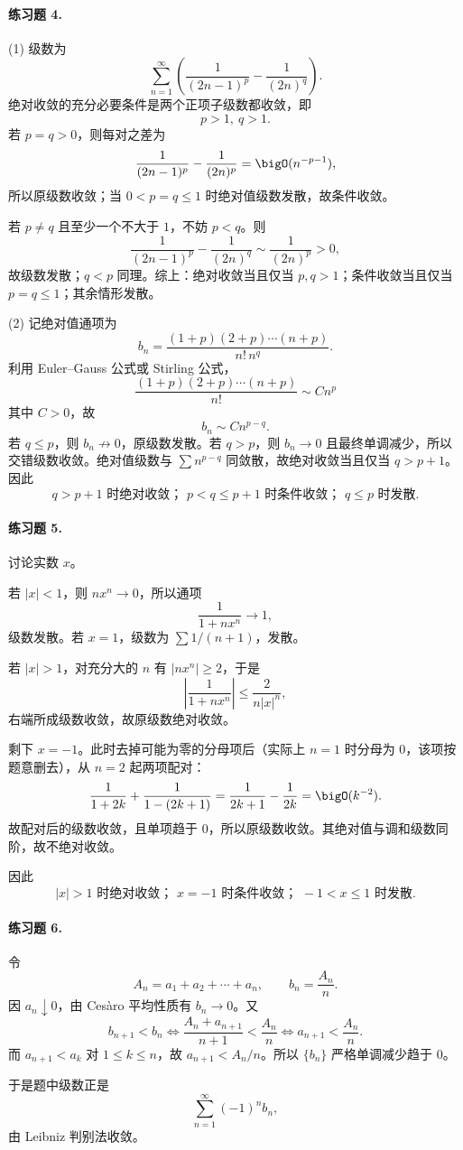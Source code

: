 \paragraph{练习题 4.}
\begin{xsolution}
(1) 级数为
\[
 \sum_{n=1}^{\infty}\left(\frac1{(2n-1)^p}-\frac1{(2n)^q}\right).
\]
绝对收敛的充分必要条件是两个正项子级数都收敛，即
\[
 \boxed{p>1,\ q>1}.
\]
若 $p=q>0$，则每对之差为
\[
 \frac1{(2n-1)^p}-\frac1{(2n)^p}=\bigO(n^{-p-1}),
\]
所以原级数收敛；当 $0<p=q\leq1$ 时绝对值级数发散，故条件收敛。

若 $p\neq q$ 且至少一个不大于 $1$，不妨 $p<q$。则
\[
 \frac1{(2n-1)^p}-\frac1{(2n)^q}\sim\frac1{(2n)^p}>0,
\]
故级数发散；$q<p$ 同理。综上：绝对收敛当且仅当 $p,q>1$；条件收敛当且仅当 $p=q\leq1$；其余情形发散。

(2) 记绝对值通项为
\[
 b_n=\frac{(1+p)(2+p)\cdots(n+p)}{n!\,n^q}.
\]
利用 Euler--Gauss 公式或 Stirling 公式，
\[
 \frac{(1+p)(2+p)\cdots(n+p)}{n!}\sim Cn^p
\]
其中 $C>0$，故
\[
 b_n\sim Cn^{p-q}.
\]
若 $q\leq p$，则 $b_n\not\to0$，原级数发散。若 $q>p$，则 $b_n\to0$ 且最终单调减少，所以交错级数收敛。绝对值级数与 $\sum n^{p-q}$ 同敛散，故绝对收敛当且仅当 $q>p+1$。因此
\[
 \boxed{q>p+1\text{ 时绝对收敛； }p<q\leq p+1\text{ 时条件收敛； }q\leq p\text{ 时发散}.}
\]
\end{xsolution}

\paragraph{练习题 5.}
\begin{xsolution}
讨论实数 $x$。

若 $|x|<1$，则 $nx^n\to0$，所以通项
\[
 \frac1{1+nx^n}\to1,
\]
级数发散。若 $x=1$，级数为 $\sum1/(n+1)$，发散。

若 $|x|>1$，对充分大的 $n$ 有 $|nx^n|\geq2$，于是
\[
 \left|\frac1{1+nx^n}\right|\leq\frac2{n|x|^n},
\]
右端所成级数收敛，故原级数绝对收敛。

剩下 $x=-1$。此时去掉可能为零的分母项后（实际上 $n=1$ 时分母为 $0$，该项按题意删去），从 $n=2$ 起两项配对：
\[
 \frac1{1+2k}+\frac1{1-(2k+1)}
 =\frac1{2k+1}-\frac1{2k}
 =\bigO(k^{-2}).
\]
故配对后的级数收敛，且单项趋于 $0$，所以原级数收敛。其绝对值与调和级数同阶，故不绝对收敛。

因此
\[
 \boxed{|x|>1\text{ 时绝对收敛； }x=-1\text{ 时条件收敛； }-1<x\leq1\text{ 时发散}.}
\]
\end{xsolution}

\paragraph{练习题 6.}
\begin{xsolution}
令
\[
 A_n=a_1+a_2+\cdots+a_n,
 \qquad
 b_n=\frac{A_n}{n}.
\]
因 $a_n\downarrow0$，由 Cesàro 平均性质有 $b_n\to0$。又
\[
 b_{n+1}<b_n
 \Longleftrightarrow
 \frac{A_n+a_{n+1}}{n+1}<\frac{A_n}{n}
 \Longleftrightarrow
 a_{n+1}<\frac{A_n}{n}.
\]
而 $a_{n+1}<a_k$ 对 $1\leq k\leq n$，故 $a_{n+1}<A_n/n$。所以 $\{b_n\}$ 严格单调减少趋于 $0$。

于是题中级数正是
\[
 \sum_{n=1}^{\infty}(-1)^n b_n,
\]
由 Leibniz 判别法收敛。
\end{xsolution}

